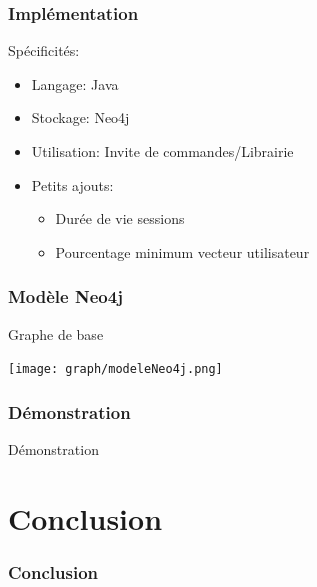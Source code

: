 \documentclass{beamer}
\begin{document}
        \begin{frame}
        \frametitle{Implémentation}
        Spécificités:
        \begin{itemize}
        \pause
        \item Langage: \pause Java
        \pause
        \item Stockage: \pause Neo4j
        \pause
        \item Utilisation: \pause Invite de commandes/Librairie
        \pause
        \item Petits ajouts:
        \pause
        \begin{itemize}
        \item Durée de vie sessions
        \pause
        \item Pourcentage minimum vecteur utilisateur
        \end{itemize}
        \end{itemize}
        \end{frame}
        \begin{frame}
        \frametitle{Modèle Neo4j}
        \begin{block}{Graphe de base}
        \begin{center}
        \texttt{[image: graph/modeleNeo4j.png]}
        \end{center}
        \end{block}
        \end{frame}
        \begin{frame}
        \frametitle{Démonstration}
        \begin{center}
        Démonstration
        \end{center}
        \end{frame}

    \section{Conclusion}
        \begin{frame}
            \frametitle{Conclusion}
        \end{frame}
\end{document}
